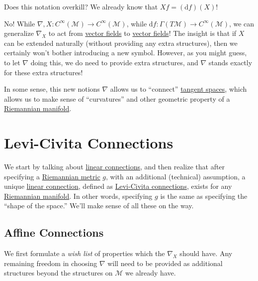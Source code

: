 \begin{problem*}
	Does this notation overkill? We already know that \(Xf = (\mathrm{d} f)(X)\)!
\end{problem*}
\begin{answer}
	No! While \(\nabla , X\colon C^{\infty} (\mathcal{M} ) \to C^{\infty} (\mathcal{M} )\), while \(\mathrm{d} f\colon \Gamma (T \mathcal{M} ) \to C^{\infty} (\mathcal{M} )\), we can generalize \(\nabla _X\) to act from \hyperref[def:vector-field]{vector fields} to \hyperref[def:vector-field]{vector fields}! The insight is that if \(X\) can be extended naturally (without providing any extra structures), then we certainly won't bother introducing a new symbol. However, as you might guess, to let \(\nabla \) doing this, we do need to provide extra structures, and \(\nabla \) stands exactly for these extra structures!
\end{answer}

In some sense, this new notions \(\nabla \) allows us to ``connect'' \hyperref[def:tangent-space]{tangent spaces}, which allows us to make sense of ``curvatures'' and other geometric property of a \hyperref[def:Riemannian-manifold]{Riemannian manifold}.

\section{Levi-Civita Connections}
We start by talking about \hyperref[def:linear-connection]{linear connections}, and then realize that after specifying a \hyperref[def:Riemannian-metric]{Riemannian metric} \(g\), with an additional (technical) assumption, a unique \hyperref[def:linear-connection]{linear connection}, defined as \hyperref[def:Levi-Civita-connection]{Levi-Civita connections}, exists for any \hyperref[def:Riemannian-manifold]{Riemannian manifold}. In other words, specifying \(g\) is the same as specifying the ``shape of the space.'' We'll make sense of all these on the way.

\subsection{Affine Connections}
We first formulate a \emph{wish list} of properties which the \(\nabla _X\) should have. Any remaining freedom in choosing \(\nabla \) will need to be provided as additional structures beyond the structures on \(\mathcal{M}\) we already have.

